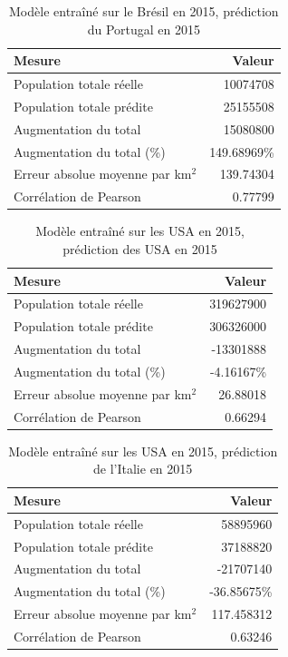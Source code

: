 \documentclass[a4paper, 11pt]{report}
\begin{document}
\begin{table}
	\centering
	\caption{Modèle entraîné sur le Brésil en 2015, prédiction du Portugal en 2015}
	\begin{tabular}{ l r }
		\hline
		\textbf{Mesure} & \textbf{Valeur} \\
		\hline\hline
		Population totale réelle & 10074708 \\
		\hline
		Population totale prédite & 25155508 \\
		\hline
		Augmentation du total & 15080800 \\
		\hline
		Augmentation du total (\%) & 149.68969\% \\
		\hline
		Erreur absolue moyenne par km$^2$ & 139.74304 \\
		\hline
		Corrélation de Pearson & 0.77799 \\
		\hline
	\end{tabular}
	\label{stats-brazil-portugal}
\end{table}

\begin{table}
	\centering
	\caption{Modèle entraîné sur les USA en 2015, prédiction des USA en 2015}
	\begin{tabular}{ l r }
		\hline
		\textbf{Mesure} & \textbf{Valeur} \\
		\hline\hline
		Population totale réelle & 319627900 \\
		\hline
		Population totale prédite & 306326000 \\
		\hline
		Augmentation du total & -13301888 \\
		\hline
		Augmentation du total (\%) & -4.16167\% \\
		\hline
		Erreur absolue moyenne par km$^2$ & 26.88018 \\
		\hline
		Corrélation de Pearson & 0.66294 \\
		\hline
	\end{tabular}
	\label{stats-usa-usa}
\end{table}

\begin{table}
	\centering
	\caption{Modèle entraîné sur les USA en 2015, prédiction de l'Italie en 2015}
	\begin{tabular}{ l r }
		\hline
		\textbf{Mesure} & \textbf{Valeur} \\
		\hline\hline
		Population totale réelle & 58895960 \\
		\hline
		Population totale prédite & 37188820 \\
		\hline
		Augmentation du total & -21707140 \\
		\hline
		Augmentation du total (\%) & -36.85675\% \\
		\hline
		Erreur absolue moyenne par km$^2$ & 117.458312 \\
		\hline
		Corrélation de Pearson & 0.63246 \\
		\hline
	\end{tabular}
	\label{stats-usa-italy}
\end{table}
\end{document}
